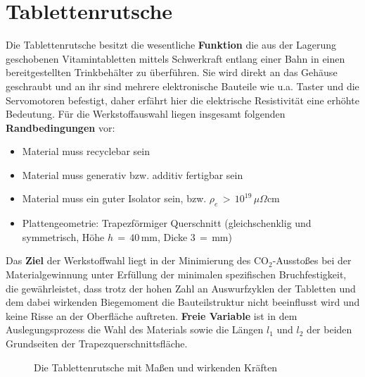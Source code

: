 \section{Tablettenrutsche}
Die Tablettenrutsche besitzt die wesentliche \textbf{Funktion} die aus der Lagerung geschobenen Vitamintabletten mittels Schwerkraft entlang einer Bahn in einen bereitgestellten Trinkbehälter zu überführen. Sie wird direkt an das Gehäuse geschraubt und an ihr sind mehrere elektronische Bauteile wie u.a. Taster und die Servomotoren befestigt, daher erfährt hier die elektrische Resistivität eine erhöhte Bedeutung. Für die Werkstoffauswahl liegen insgesamt folgenden \textbf{Randbedingungen} vor:
\begin{itemize}
	\item Material muss recyclebar sein
	\item Material muss generativ bzw. additiv fertigbar sein
	\item Material muss ein guter Isolator sein, bzw. $\rho_e\,>\,10^{19}\,\mu\Omega$cm
	\item Plattengeometrie: Trapezförmiger Querschnitt (gleichschenklig und symmetrisch, Höhe $h\,=\,40\,$mm, Dicke $3\,=\,$mm)
\end{itemize}
Das \textbf{Ziel} der Werkstoffwahl liegt in der Minimierung des CO$_2$-Ausstoßes bei der Materialgewinnung unter Erfüllung der minimalen spezifischen Bruchfestigkeit, die gewährleistet, dass trotz der hohen Zahl an Auswurfzyklen der Tabletten und dem dabei wirkenden Biegemoment die Bauteilstruktur nicht beeinflusst wird und keine Risse an der Oberfläche auftreten. \textbf{Freie Variable} ist in dem Auslegungsprozess die Wahl des Materials sowie die Längen $l_1$ und $l_2$ der beiden Grundseiten der Trapezquerschnittsfläche.\\
\begin{figure}[H]
	\centering
	\qquad
	\caption{Die Tablettenrutsche mit Maßen und wirkenden Kräften}
	\label{fig:3_3}
\end{figure}
